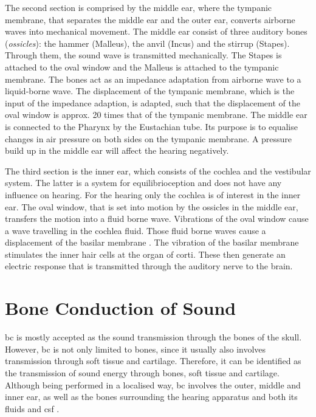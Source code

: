 The second section is comprised by the middle ear, where the tympanic membrane, that separates the middle ear and the outer ear, converts airborne waves into mechanical movement. The middle ear consist of three auditory bones (\textit{ossicles}): the hammer (Malleus), the anvil (Incus) and the stirrup (Stapes). Through them, the sound wave is transmitted mechanically. The Stapes is attached to the oval window and the Malleus is attached to the tympanic membrane. The bones act as an impedance adaptation from airborne wave to a liquid-borne wave. The displacement of the tympanic membrane, which is the input of the impedance adaption, is adapted, such that the displacement of the oval window is approx. 20 times that of the tympanic membrane. The middle ear is connected to the Pharynx by the Eustachian tube. Its purpose is to equalise changes in air pressure on both sides on the tympanic membrane. A pressure build up in the middle ear will affect the hearing negatively. %

The third section is the inner ear, which consists of the cochlea and the vestibular system. The latter is a system for equilibrioception and does not have any influence on hearing. For the hearing only the cochlea is of interest in the inner ear. The oval window, that is set into motion by the ossicles in the middle ear, transfers the motion into a fluid borne wave. Vibrations of the oval window cause a wave travelling in the cochlea fluid. Those fluid borne waves cause a displacement of the basilar membrane \citep{ho_2017}. The vibration of the basilar membrane stimulates the inner hair cells at the organ of corti. These then generate an electric response that is transmitted through the auditory nerve to the brain.



\section{Bone Conduction of Sound}\label{sec:bonepaths}
\gls{bc} is mostly accepted as the sound transmission through the bones of the skull. However, \gls{bc} is not only limited to bones, since it usually also involves transmission through soft tissue and cartilage. Therefore, it can be identified as the transmission of sound energy through bones, soft tissue and cartilage. 
Although being performed in a localised way, \gls{bc} involves the outer, middle and inner ear, as well as the bones surrounding the hearing apparatus and both its fluids and \gls{csf} \citep{puria_2013}.
 
